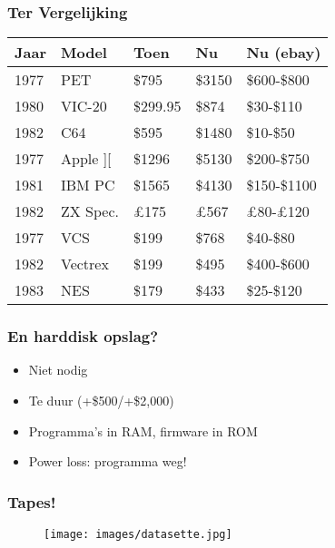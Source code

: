 \documentclass[aspectratio=43]{uva-inf-presentation}
\begin{document}

\begin{frame}
\frametitle{Ter Vergelijking}

\begin{tabular}{|l|l|l|l|l|}
\hline Jaar & Model & Toen & Nu & Nu (ebay) \\ \hline
1977 & PET & \$795 & \$3150 & \$600-\$800 \\
1980 & VIC-20 & \$299.95 & \$874 & \$30-\$110 \\
1982 & C64 & \$595 & \$1480 & \$10-\$50 \\ \hline
1977 & Apple ][ & \$1296 & \$5130 & \$200-\$750 \\
1981 & IBM PC & \$1565 & \$4130 & \$150-\$1100 \\
1982 & ZX Spec. & \pounds 175 & \pounds 567 & \pounds 80-\pounds 120 \\ \hline
1977 & VCS & \$199 & \$768 & \$40-\$80 \\
1982 & Vectrex & \$199 & \$495 & \$400-\$600 \\
1983 & NES & \$179 & \$433 & \$25-\$120 \\ \hline
\end{tabular}

\end{frame}


\begin{frame}
\frametitle{En harddisk opslag?}

\begin{itemize}
\item Niet nodig
\item Te duur (+\$500/+\$2,000)
\item Programma's in RAM, firmware in ROM
\item Power loss: programma weg!
\end{itemize}

\end{frame}


\begin{frame}
\frametitle{Tapes!}

\begin{figure}
\texttt{[image: images/datasette.jpg]}
\end{figure}

\end{frame}
\end{document}

